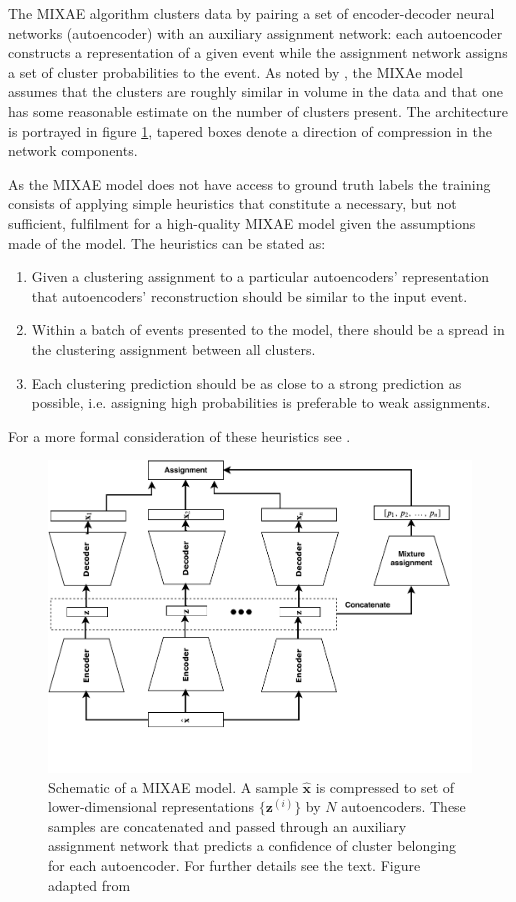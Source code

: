 \documentclass[review,number,sort&compress]{elsarticle}
\begin{document}
The MIXAE algorithm clusters data by pairing a set of encoder-decoder neural networks (autoencoder) with an auxiliary assignment network: each autoencoder constructs a representation of a given event while the assignment network assigns a set of cluster probabilities to the event. As noted by \citet{Zhang}, the MIXAe model assumes that the clusters are roughly similar in volume in the data and that one has some reasonable estimate on the number of clusters present. The architecture is portrayed in figure \ref{fig:mixae}, tapered boxes denote a direction of compression in the network components. 

As the MIXAE model does not have access to ground truth labels the training consists of applying simple heuristics that constitute a necessary, but not sufficient, fulfilment for a high-quality MIXAE model given the assumptions made of the model. The heuristics can be stated as: 
\begin{enumerate}
	\item  Given a clustering assignment to a particular autoencoders' representation that autoencoders' reconstruction should be similar to the input event. 
	\item Within a batch of events presented to the model, there should be a spread in the clustering assignment between all clusters. 
	\item Each clustering prediction should be as close to a strong prediction as possible, i.e. assigning high probabilities is preferable to weak assignments.
\end{enumerate}

\noindent For a more formal consideration of these heuristics see \citet{Zhang}.

\begin{figure}[tb]
	\centering
	\includegraphics[width=\textwidth]{plots/mixae.pdf}
	\caption[Mixture of autoencoders schematic]{Schematic of a MIXAE model. A sample $\hat{\boldsymbol{x}}$ is compressed to set of lower-dimensional representations $\{\boldsymbol{z}^{(i)}\}$ by $N$ autoencoders. These samples are concatenated and passed through an auxiliary assignment network that predicts a confidence of cluster belonging for each autoencoder. For further details see the text. Figure adapted from \citet{Zhang}}
	\label{fig:mixae}
\end{figure}
\end{document}
